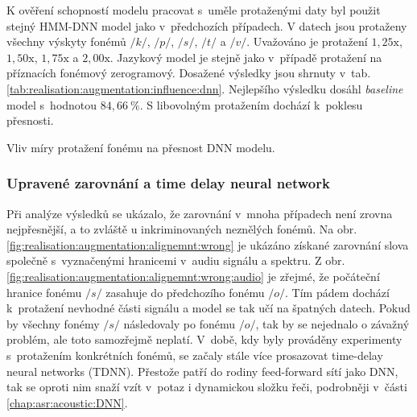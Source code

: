 K ověření schopností modelu pracovat s~uměle protaženými daty byl použit stejný HMM-DNN model jako v~předchozích případech.
V datech jsou protaženy všechny výskyty fonémů $/k/$, $/p/$, $/s/$, $/t/$ a $/v/$. Uvažováno je protažení $1,25\mathrm{x}$, $1,50\mathrm{x}$, $1,75\mathrm{x}$ a $2,00\mathrm{x}$. Jazykový model je stejně jako v~případě protažení na příznacích fonémový zerogramový.
Dosažené výsledky jsou shrnuty v~tab. \ref{tab:realisation:augmentation:influence:dnn}.
Nejlepšího výsledku dosáhl \textit{baseline} model s~hodnotou $84,66~\%$.
S libovolným protažením dochází  k~poklesu přesnosti.

\begin{table}[htpb]
  \centering
  \def\arraystretch{1.5}
  \caption{Vliv míry protažení fonému na přesnost DNN modelu.}
  \label{tab:realisation:augmentation:influence:dnn}
\end{table}

\subsubsection{Upravené zarovnání a time delay neural network}

Při analýze výsledků se ukázalo, že zarovnání v~mnoha případech není zrovna nejpřesnější, a to zvláště u inkriminovaných neznělých fonémů.
Na obr. \ref{fig:realisation:augmentation:alignemnt:wrong} je ukázáno získané zarovnání slova  společně s~vyznačenými hranicemi v~audiu signálu a spektru.
Z obr. \ref{fig:realisation:augmentation:alignemnt:wrong:audio} je zřejmé, že počáteční hranice fonému $/s/$ zasahuje do předchozího fonému $/o/$.
Tím pádem dochází  k~protažení nevhodné části signálu a model se tak učí na špatných datech.
Pokud by všechny fonémy $/s/$ následovaly po fonému $/o/$, tak by se nejednalo o závažný problém, ale toto samozřejmě neplatí.
V~době, kdy byly prováděny experimenty s~protažením konkrétních fonémů, se začaly stále více prosazovat time-delay neural networks (TDNN).
Přestože patří do rodiny feed-forward sítí jako DNN, tak se oproti nim snaží vzít v~potaz i dynamickou složku řeči, podrobněji v~části \ref{chap:asr:acoustic:DNN}.


